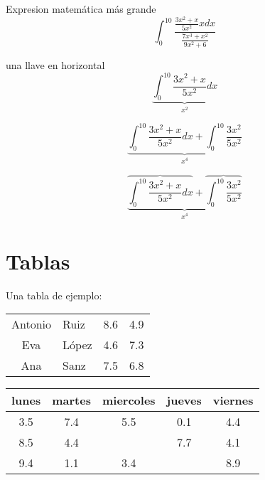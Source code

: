 \documentclass[10pt, a4paper]{report}
\begin{document}
Expresion matemática más grande
$$ \int_{0}^{10} \frac{\frac{3x^2+x}{5x^2} x dx}{\frac{7x^3+x^2}{9x^2+6}} $$

una llave en horizontal
$$ \underbrace
		{
		\int_{0}^{10}
			\frac{3x^2+x}{5x^2}dx
		}
		_{x^2}
$$

$$\underbrace{ 
	\int_{0}^{10} 
		\frac{3x^2+x}{5x^2} dx 
	+ \int_{0}^{10} 
		\frac{3x^2}{5x^2}
	}_{x^4}
$$

$$\underbrace{ 
	\overbrace{
		\int_{0}^{10} 
			\frac{3x^2+x}{5x^2} dx
			}
			+
	\overbrace{ 
		 \int_{0}^{10} 
			\frac{3x^2}{5x^2}
			}
		}_{x^4}
$$

\chapter{Tablas}

Una tabla de ejemplo:\\

\begin{tabular}{|c|l|c|c|}
  \hline Antonio & Ruiz  & 8.6 & 4.9 \\ 
   Eva     & López & 4.6 & 7.3 \\
   Ana     & Sanz  & 7.5 & 6.8 \\
\end{tabular}

\begin{tabular}{|c|c|c|c|c|}
   \hline lunes & martes & miercoles & jueves & viernes \\
   \hline 3.5   & 7.4    & 5.5       & 0.1    & 4.4     \\
   \hline 8.5   & 4.4    &           & 7.7    & 4.1     \\
   \hline 9.4   & 1.1    & 3.4       &        & 8.9     \\
   \hline

\end{tabular}
\end{document}
